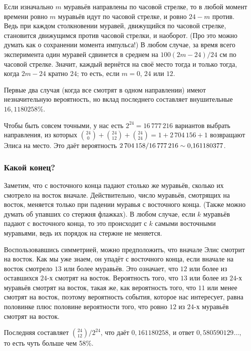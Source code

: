 Если изначально $m$ муравьёв направлены по часовой стрелке, то в любой момент времени ровно $m$ муравьёв идут по часовой стрелке, и ровно $24 - m$ против.
Ведь при каждом столкновении муравей, движущийся по часовой стрелке, становится движущимся против часовой стрелки, и наоборот.
(Про это можно думать как о сохранении момента импульса!)
В любом случае, за время всего эксперимента один муравей сдвинется в среднем на $100(2m - 24)/24$ см по часовой стрелке.
Значит, каждый вернётся на своё место тогда и только тогда, когда $2m - 24$ кратно $24$; то есть, если $m = 0$, $24$ или $12$.

Первые два случая (когда все смотрят в одном направлении) имеют незначительную вероятность, но вклад последнего составляет внушительные $16{,}1180258\%$. %

Чтобы быть совсем точными, у нас есть $2^{24}=16\,777\,216$ вариантов выбрать направления, из которых  $\binom{24}0+\binom{24}{12}+\binom{24}{24}=1+2\,704\,156+1$ возвращают Элиса на место.
Это даёт вероятность $2\,704\,158/16\,777\,216 \z\sim 0{,}161180377$.

\subsubsection*{Какой конец?}

Заметим, что с восточного конца падают столько же муравьёв, сколько их смотрело на восток вначале.
Действительно, число муравьёв, смотрящих на восток, меняется только при падении муравья с восточного конца.
(Также можно думать об упавших со стержня флажках).
В любом случае, если $k$ муравьёв падают с восточного конца, то это происходит с $k$ самыми восточными муравьями, ведь их порядок на стержне не меняется.

Воспользовавшись симметрией, можно предположить, что вначале Элис смотрит на восток.
Как мы уже знаем, он упадёт с восточного конца, если вначале на восток смотрело $13$ или более муравьёв.
Это означает, что $12$ или более из оставшихся $24$-х смотрят на восток.
Вероятность того, что $13$ или более из $24$-х муравьёв смотрят на восток, такая же, как вероятность того, что $11$ или менее смотрят на восток, поэтому вероятность события, которое нас интересует, равна половинке плюс половине вероятности того, что ровно $12$ из $24$-х муравьёв смотрят на восток.

Последняя составляет $\binom{24}{12}/2^{24}$, что даёт $0{,}161180258$, и ответ $0{,}580590129\dots$, то есть чуть больше чем 58\%.

